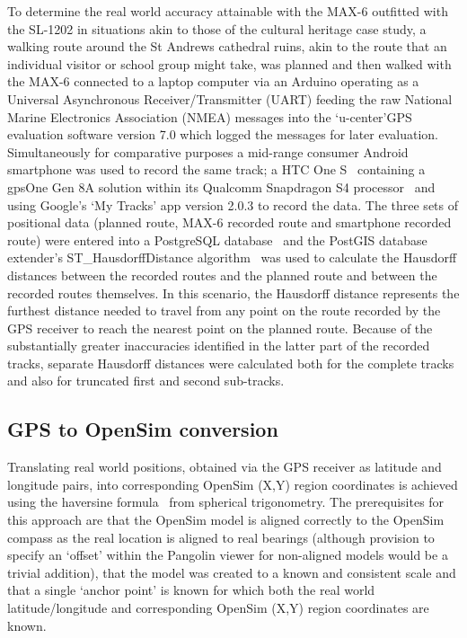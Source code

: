 To determine the real world accuracy attainable with the MAX-6 outfitted with the SL-1202 in situations akin to those of the cultural heritage case study, a walking route around the St Andrews cathedral ruins, akin to the route that an individual visitor or school group might take, was planned and then walked with the MAX-6 connected to a laptop computer via an Arduino operating as a Universal Asynchronous Receiver/Transmitter (UART) feeding the raw National Marine Electronics Association (NMEA) messages into the `u-center'GPS evaluation software version 7.0 which logged the messages for later evaluation. Simultaneously for comparative purposes a mid-range consumer Android smartphone was used to record the same track; a HTC One S~\cite{HTCCorporation2013} containing a gpsOne Gen 8A solution within its Qualcomm Snapdragon S4 processor~\cite{QualcommIncorporated2013} and using Google's `My Tracks' app version 2.0.3 to record the data. The three sets of positional data (planned route, MAX-6 recorded route and smartphone recorded route) were entered into a PostgreSQL database~\cite{Daviesc,Daviesb} and the PostGIS database extender's ST\_HausdorffDistance algorithm~\cite{PostGIS} was used to calculate the Hausdorff distances between the recorded routes and the planned route and between the recorded routes themselves. In this scenario, the Hausdorff distance represents the furthest distance needed to travel from any point on the route recorded by the GPS receiver to reach the nearest point on the planned route. Because of the substantially greater inaccuracies identified in the latter part of the recorded tracks, separate Hausdorff distances were calculated both for the complete tracks and also for truncated first and second sub-tracks.

\subsection{GPS to OpenSim conversion}
Translating real world positions, obtained via the GPS receiver as latitude and longitude pairs, into corresponding OpenSim (X,Y) region coordinates is achieved using the haversine formula~\cite{Gellert1989} from spherical trigonometry. The prerequisites for this approach are that the OpenSim model is aligned correctly to the OpenSim compass as the real location is aligned to real bearings (although provision to specify an `offset' within the Pangolin viewer for non-aligned models would be a trivial addition), that the model was created to a known and consistent scale and that a single `anchor point' is known for which both the real world latitude/longitude and corresponding OpenSim (X,Y) region coordinates are known.

